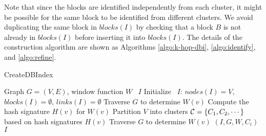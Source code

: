 Note that since the blocks are identified independently from each cluster,
it might be possible for the same block to be identified from different clusters.
We avoid duplicating the same block in $blocks(I)$ by checking that a block $B$ is not already in $blocks(I)$
before inserting it into $blocks(I)$.
The details of the construction algorithm are shown as Algorithms
\ref{algo:k-hop-dbi},
\ref{algo:identify},
and
\ref{algo:refine}.
\begin{algorithm}
\caption{CreateDBIndex}
\begin{algorithmic}[1]  \small
\Require Graph $G=(V,E)$, window function $W$
\Ensure \DBIndex\ $I$
\State Initialize \DBIndex\ $I$: $nodes(I)=V$, $blocks(I)=\emptyset$, $links(I)=\emptyset$
	\State Traverse $G$ to determine $W(v)$
	\State Compute the hash signature $H(v)$ for $W(v)$
\EndFor
\State Partition $V$ into clusters ${\cal C} = \{C_1,C_2,\cdots\}$ based on hash signatures $H(v)$
		\State Traverse $G$ to determine $W(v)$
	\EndFor
	 $(I,G,W,C_i)$
\EndFor
\Return $I$
\end{algorithmic}
\label{algo:k-hop-dbi}
\end{algorithm}


